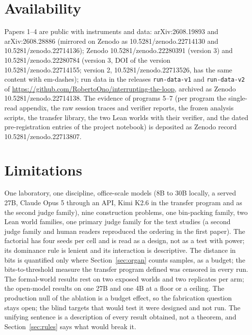 \documentclass[11pt]{article}
\begin{document}
\section{Availability}
\label{sec:availability}

Papers 1--4 are public with instruments and data: arXiv:2608.19893 and
arXiv:2608.28886 (mirrored on Zenodo as 10.5281/zenodo.22714130 and
10.5281/zenodo.22714136); Zenodo 10.5281/zenodo.22280391 (version 3) and
10.5281/zenodo.22280784 (version 3, DOI of the version
10.5281/zenodo.22714155; version 2, 10.5281/zenodo.22713526, has the same
content with em-dashes); run data in the releases \texttt{run-data-v1}
and \texttt{run-data-v2} of
\url{https://github.com/RobertoOno/interrupting-the-loop}, archived as
Zenodo 10.5281/zenodo.22714138. The evidence
of programs 5--7 (per program the single-read appendix, the raw session
traces and verifier reports, the frozen analysis scripts, the transfer
library, the two Lean worlds with their verifier, and the dated
pre-registration entries of the project notebook) is deposited as Zenodo
record 10.5281/zenodo.22713807.

\section{Limitations}
\label{sec:limits}

One laboratory, one discipline, office-scale models (8B to 30B locally, a
served 27B, Claude Opus 5 through an API, Kimi K2.6 in the transfer program
and as the second judge family), nine construction problems, one
bin-packing family, two Lean world families, one primary judge family for
the text studies (a second judge family and human readers reproduced the
ordering in the first paper). The factorial has four seeds per cell and is
read as a design, not as a test with power; its dominance rule is lenient
and its interaction is descriptive. The distance in bits is quantified only
where Section~\ref{sec:organ} counts samples, as a budget; the
bits-to-threshold measure the transfer program defined was censored in
every run. The formal-world results rest on two exposed worlds and two
replicates per arm; the open-model results on one 27B and one 4B at a
floor or a ceiling. The production null of the ablation is a budget
effect, so the fabrication question stays open; the blind targets that
would test it were designed and not run. The unifying sentence is a
description of every result obtained, not a theorem, and
Section~\ref{sec:rules} says what would break it.
\end{document}
